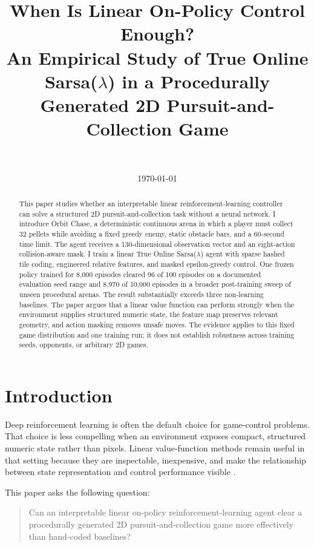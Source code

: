 \documentclass[11pt]{article}
\title{When Is Linear On-Policy Control Enough?\\
An Empirical Study of True Online Sarsa($\lambda$) in a Procedurally Generated 2D Pursuit-and-Collection Game}
\author{\todo{Author name}\\\todo{Institution or course}}
\date{\today}
\begin{document}
\maketitle

\begin{abstract}
This paper studies whether an interpretable linear reinforcement-learning
controller can solve a structured 2D pursuit-and-collection task without a
neural network. I introduce Orbit Chase, a deterministic continuous arena in
which a player must collect 32 pellets while avoiding a fixed greedy enemy,
static obstacle bars, and a 60-second time limit. The agent receives a
130-dimensional observation vector and an eight-action collision-aware mask.
I train a linear True Online Sarsa($\lambda$) agent with sparse hashed tile
coding, engineered relative features, and masked epsilon-greedy control.
One frozen policy trained for 8,000 episodes cleared 96 of 100 episodes on a
documented evaluation seed range and 8,970 of 10,000 episodes in a broader
post-training sweep of unseen procedural arenas. The result substantially
exceeds three non-learning baselines. The paper argues that a linear value
function can perform strongly when the environment supplies structured numeric
state, the feature map preserves relevant geometry, and action masking removes
unsafe moves. The evidence applies to this fixed game distribution and one
training run; it does not establish robustness across training seeds,
opponents, or arbitrary 2D games.
\end{abstract}

\section{Introduction}

Deep reinforcement learning is often the default choice for game-control
problems. That choice is less compelling when an environment exposes compact,
structured numeric state rather than pixels. Linear value-function methods
remain useful in that setting because they are inspectable, inexpensive, and
make the relationship between state representation and control performance
visible \cite{sutton-barto-2018,van-seijen-2016}.

This paper asks the following question:

\begin{quote}
Can an interpretable linear on-policy reinforcement-learning agent clear a
procedurally generated 2D pursuit-and-collection game more effectively than
hand-coded baselines?
\end{quote}
\end{document}
